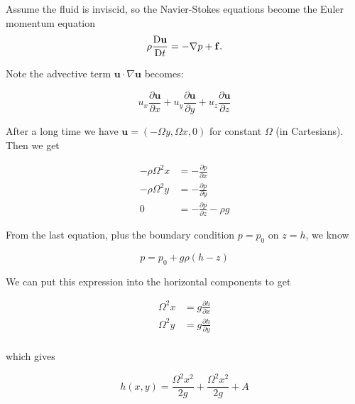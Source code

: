 \documentclass[a4paper]{article}
\begin{document}
\begin{center}
\end{center}

Assume the fluid is inviscid, so the Navier-Stokes equations become the Euler momentum equation
	\[
	\rho \frac{\mathrm{D} \mathbf{u}}{\mathrm{D} t} = - \nabla p + \mathbf{f}.
	\]
	
Note the advective term $ \mathbf{u} \cdot \nabla \mathbf{u} $ becomes:

\[ u_{x} \frac{\partial \mathbf{u} }{\partial x} + u_{y} \frac{\partial \mathbf{u} }{\partial y} + u_{z} \frac{\partial \mathbf{u} }{\partial z} \]

After a long time we have $ \mathbf{u} = (- \Omega y, \Omega x, 0) $ for constant $ \Omega $ (in Cartesians). Then we get

\begin{align*}
- \rho \Omega^{2} x & =  - \frac{\partial p }{\partial x} \\
- \rho \Omega^{2} y & = - \frac{\partial p }{\partial y} \\
0 & = - \frac{\partial p }{\partial z} - \rho g 
\end{align*} 

From the last equation, plus the boundary condition $ p = p_{0} $ on $ z = h $, we know

\[ p = p_{0} + g \rho (h - z) \]

We can put this expression into the horizontal components to get


\begin{align*}
 \Omega^{2} x & =  g \frac{\partial h }{\partial x} \\
 \Omega^{2} y & = g \frac{\partial h }{\partial y} \\
\end{align*} 

which gives

\[ h(x,y) = \frac{\Omega^{2}x^{2}}{2g} + \frac{\Omega^{2}x^{2}}{2g} + A  \]
\end{document}
